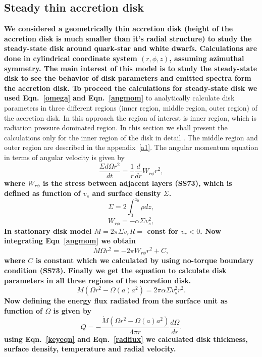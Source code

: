 \documentclass[useAMS,usenatbib]{mn2e}
\begin{document}
\subsection{Steady thin accretion disk}
\textbf{We considered a geometrically thin accretion disk (height of the accretion disk is much smaller than it's radial structure) to study the steady-state disk around quark-star and white dwarfs. Calculations are done in cylindrical coordinate system $(r,\phi,z)$, assuming azimuthal symmetry. The main interest of this model is to study the steady-state disk to see the behavior of disk parameters and emitted spectra form the accretion disk. To proceed the calculations for steady-state disk we used Eqn.~\ref{omega}} \textbf{and Eqn.~\ref{angmom}} to analytically calculate disk parameters in three different regions (inner region, middle region, outer region) of the accretion disk. In this approach the region of interest is inner region, which is radiation pressure dominated region. In this section we shall present the calculations only for the inner region of the disk in detail . The middle region and outer region are described in the appendix~\ref{a1}. The angular momentum equation in terms of angular velocity is given by
\textbf{
\begin{equation}
\frac{\Sigma d\Omega r^2}{dt} = \frac{1}{r}\frac{d}{dr}W_{r\phi}r^2,
\label{angmom}
\end{equation}
where $W_{r\phi}$ is the stress between adjacent layers (SS73), which is defined as function of $v_s$ and surface density $\Sigma$.
\begin{equation}
\Sigma = 2\int_0^{z_0} \rho dz,
\end{equation}
\begin{equation}
W_{r\phi} = -\alpha\Sigma v_s^2,
\end{equation}
In stationary disk model $\dot{M} = 2\pi\Sigma v_r R =$ const for $v_r < 0$. Now integrating Eqn~\ref{angmom} we obtain
\begin{equation}
\dot{M}\Omega r^2 = -2\pi W_{r\phi}r^2 + C,
\label{const}
\end{equation}
where $C$ is constant which we calculated by using no-torque boundary condition (SS73). Finally we get the equation to calculate disk parameters in all three regions of the accretion disk.
\begin{equation}
\dot{M}\left(\Omega r^2 - \Omega(a)a^2\right) = 2\pi\alpha\Sigma v_s^2 r^2.
\label{keyeqn}
\end{equation}
Now defining the energy flux radiated from the surface unit as function of $\Omega$ is given by
\begin{equation}
Q = -\frac{\dot{M}\left(\Omega r^2 - \Omega(a)a^2\right)}{4\pi r}\frac{d\Omega}{dr}.
\label{radflux}
\end{equation}
using Eqn.~\ref{keyeqn} and Eqn.~\ref{radflux} we calculated disk thickness, surface density, temperature and radial velocity.}
\end{document}
